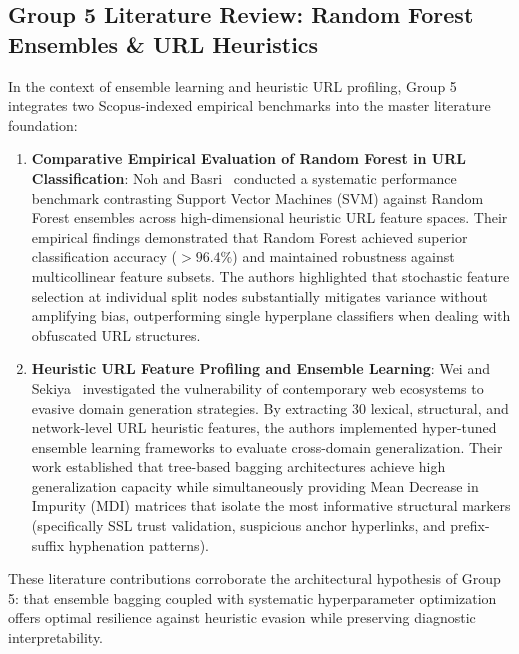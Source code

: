 \subsection{Group 5 Literature Review: Random Forest Ensembles \& URL Heuristics}
\label{sec:lit_review_g5}

In the context of ensemble learning and heuristic URL profiling, Group 5 integrates two Scopus-indexed empirical benchmarks into the master literature foundation:

\begin{enumerate}
    \item \textbf{Comparative Empirical Evaluation of Random Forest in URL Classification}: 
    Noh and Basri~\cite{noh2021url} conducted a systematic performance benchmark contrasting Support Vector Machines (SVM) against Random Forest ensembles across high-dimensional heuristic URL feature spaces. Their empirical findings demonstrated that Random Forest achieved superior classification accuracy ($>96.4\%$) and maintained robustness against multicollinear feature subsets. The authors highlighted that stochastic feature selection at individual split nodes substantially mitigates variance without amplifying bias, outperforming single hyperplane classifiers when dealing with obfuscated URL structures.
    
    \item \textbf{Heuristic URL Feature Profiling and Ensemble Learning}: 
    Wei and Sekiya~\cite{wei2022phishing} investigated the vulnerability of contemporary web ecosystems to evasive domain generation strategies. By extracting 30 lexical, structural, and network-level URL heuristic features, the authors implemented hyper-tuned ensemble learning frameworks to evaluate cross-domain generalization. Their work established that tree-based bagging architectures achieve high generalization capacity while simultaneously providing Mean Decrease in Impurity (MDI) matrices that isolate the most informative structural markers (specifically SSL trust validation, suspicious anchor hyperlinks, and prefix-suffix hyphenation patterns).
\end{enumerate}

These literature contributions corroborate the architectural hypothesis of Group 5: that ensemble bagging coupled with systematic hyperparameter optimization offers optimal resilience against heuristic evasion while preserving diagnostic interpretability.
